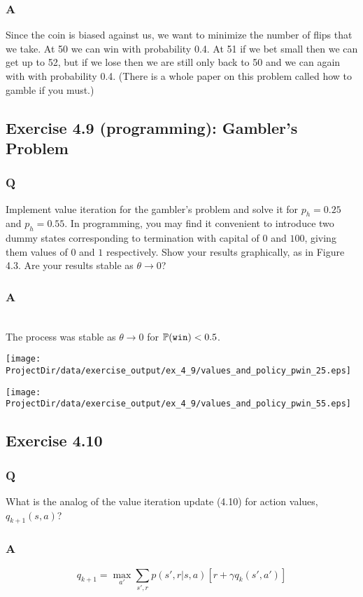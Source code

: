 \subsubsection*{A}
Since the coin is biased against us, we want to minimize the number of flips that we take. At 50 we can win with probability 0.4. At 51 if we bet small then we can get up to 52, but if we lose then we are still only back to 50 and we can again with with probability 0.4. (There is a whole paper on this problem called how to gamble if you must.)


\subsection{Exercise 4.9 (programming): Gambler's Problem}
\subsubsection*{Q}
Implement value iteration for the gambler's problem and solve it for $p_h = 0.25$ and $p_h = 0.55$. In programming, you may find it convenient to introduce two dummy states corresponding to termination with capital of $0$ and $100$, giving them values of $0$ and $1$ respectively. Show your results graphically, as in Figure 4.3. Are your results stable as $\theta \to 0$?

\subsubsection*{A}
\ProgrammingExercise\\

The process was stable as $\theta \to 0$ for $\P{}(\mathtt{win}) < 0.5$.

\texttt{[image: \\ProjectDir/data/exercise\_output/ex\_4\_9/values\_and\_policy\_pwin\_25.eps]}

\texttt{[image: \\ProjectDir/data/exercise\_output/ex\_4\_9/values\_and\_policy\_pwin\_55.eps]}

\subsection{Exercise 4.10}
\subsubsection*{Q}
What is the analog of the value iteration update (4.10) for action values, $q_{k+1}(s, a)$?

\subsubsection*{A}
\begin{equation}
    q_{k+1} = \max_{a'} \sum_{s', r} p(s', r| s, a)\left[r + \gamma q_k(s', a')\right]
\end{equation}

